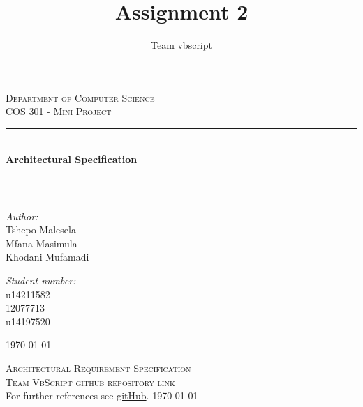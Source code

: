 \documentclass[a4paper,12pt]{report}
\author{Team vbscript}
\title{ Assignment 2}
\newcommand{\HRule}{\rule{\linewidth}{0.5mm}}
\begin{document}
\setlength{\parskip}{6pt}

\begin{titlepage}

\begin{center}
  
\textsc{\LARGE Department of Computer Science}\\[1.5cm]
\textsc{\Large COS 301 - Mini Project}\\[0.5cm]
\HRule \\[0.4cm]
{ \huge \bfseries Architectural Specification}\\[0.4cm]
\HRule \\[0.4cm]
\begin{minipage}{0.4\textwidth}
\begin{flushleft} \large
\emph{Author:}\\
Tshepo {Malesela}\\
Mfana Masimula\\
Khodani Mufamadi
\end{flushleft}
\end{minipage}
\begin{minipage}{0.4\textwidth}
\begin{flushright} \large
\emph{Student number:} \\
u14211582\\
12077713\\
u14197520
\end{flushright}
\end{minipage}

\vfill

{\large \today}
\end{center}
\end{titlepage}
\footnotesize
\normalsize

\renewcommand{\thesection}{\arabic{section}}

\begin{center}
\tableofcontents
\footnotesize
\normalsize  
\end{center}

\renewcommand{\thesection}{\arabic{section}}
\newpage
\begin{center}
	\textsc{\LARGE Architectural Requirement Specification}\\[1.5cm]
	\textsc{\Large Team VbScript github repository link}\\[0.5cm]
	For further references see \href{https://github.com/mfanamasimula/VBScript}{gitHub}.
	\today
\end{center}
\newpage
\end{document}

